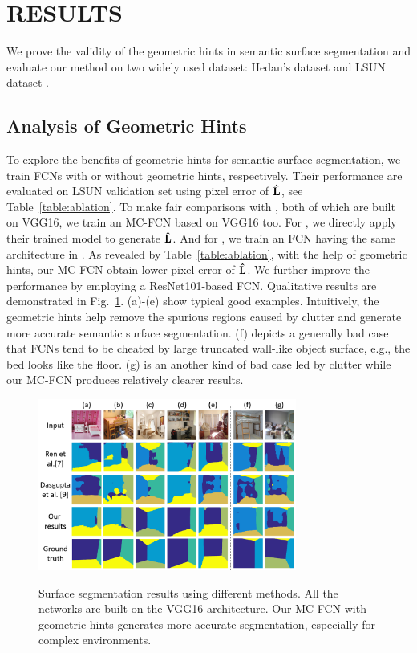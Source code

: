 \section{RESULTS}
\label{sec:Res}

We prove the validity of the geometric hints in semantic surface segmentation and evaluate our method on two widely used dataset: Hedau's dataset \cite{hedau2009recovering} and LSUN dataset \cite{zhang2015large}. 

\subsection{Analysis of Geometric Hints}
\label{sec:ablation}
To explore the benefits of geometric hints for semantic surface segmentation, we train FCNs with or without geometric hints, respectively. Their performance are evaluated on LSUN validation set using pixel error of $\mathbf{\hat{L}}$, see Table~\ref{table:ablation}. To make fair comparisons with \cite{ren2016coarse, dasgupta2016delay}, both of which are built on VGG16, we train an MC-FCN based on VGG16 too. For \cite{ren2016coarse}, we directly apply their trained model to generate $\mathbf{\hat{L}}$. And for \cite{dasgupta2016delay}, we train an FCN having the same architecture in \cite{dasgupta2016delay}. As revealed by Table~\ref{table:ablation}, with the help of geometric hints, our MC-FCN obtain lower pixel error of $\mathbf{\hat{L}}$. We further improve the performance by employing a ResNet101-based FCN. Qualitative results are demonstrated in Fig.~\ref{fig:fcn-comparison}. (a)-(e) show typical good examples. Intuitively, the geometric hints help remove the spurious regions caused by clutter and generate more accurate semantic surface segmentation. (f) depicts a generally bad case that FCNs tend to be cheated by large truncated wall-like object surface, e.g., the bed looks like the floor. (g) is an another kind of bad case led by clutter while our MC-FCN produces relatively clearer results.  

\begin{figure}[!ht]
	\centering 
	\textsc{\includegraphics[width=8.5cm]{figure/compare1.png}}
	\caption{Surface segmentation results using different methods. All the networks are built on the VGG16 architecture. Our MC-FCN with geometric hints generates more accurate segmentation, especially  for complex environments.}
	\label{fig:fcn-comparison}
\end{figure}

